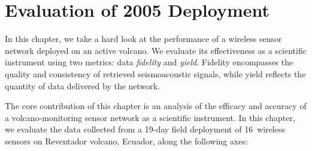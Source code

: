 \chapter{Evaluation of 2005 Deployment}
\label{chapter-evaluation}

In this chapter, we take a hard look at the performance of a wireless sensor
network deployed on an active volcano. We evaluate its effectiveness as a
scientific instrument using two metrics: data \textit{fidelity} and
\textit{yield}. Fidelity encompasses the quality and consistency of retrieved
seismoacoustic signals, while yield reflects the quantity of data delivered
by the network. 

The core contribution of this chapter is an analysis of the efficacy and
accuracy of a volcano-monitoring sensor network as a scientific instrument.
In this chapter, we evaluate the data collected from a 19-day field
deployment of 16~wireless sensors on Reventador volcano, Ecuador, along the
following axes:

